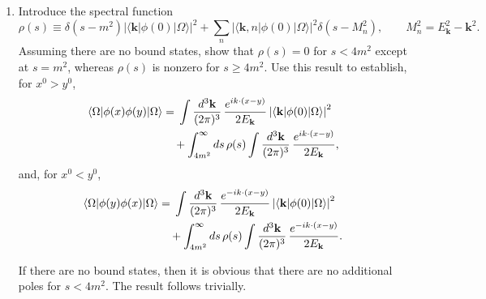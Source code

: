 \begin{enumerate}[label=\alph*)]
    \item Introduce the spectral function
    \begin{equation}
        \rho(s)
        \equiv
        \delta(s-m^2)
        \left|\langle\mathbf k|\phi(0)|\Omega\rangle\right|^2
        +\sum_n
        \left|\langle\mathbf k,n|\phi(0)|\Omega\rangle\right|^2
        \delta(s-M_n^2),
        \qquad
        M_n^2=E_{\mathbf k}^2-\mathbf k^2.
    \end{equation}
    Assuming there are no bound states, show that $\rho(s)=0$ for $s<4m^2$
    except at $s=m^2$, whereas $\rho(s)$ is nonzero for $s\geq4m^2$. Use
    this result to establish, for $x^0>y^0$,
    \begin{align}
        \langle\Omega|\phi(x)\phi(y)|\Omega\rangle
        &={}
        \int\frac{d^3\mathbf k}{(2\pi)^3}\,
        \frac{e^{ik\cdot(x-y)}}{2E_{\mathbf k}}
        \left|\langle\mathbf k|\phi(0)|\Omega\rangle\right|^2
        \notag\\
        &\quad+
        \int_{4m^2}^{\infty}ds\,\rho(s)
        \int\frac{d^3\mathbf k}{(2\pi)^3}\,
        \frac{e^{ik\cdot(x-y)}}{2E_{\mathbf k}},
    \end{align}
    and, for $x^0<y^0$,
    \begin{align}
        \langle\Omega|\phi(y)\phi(x)|\Omega\rangle
        &={}
        \int\frac{d^3\mathbf k}{(2\pi)^3}\,
        \frac{e^{-ik\cdot(x-y)}}{2E_{\mathbf k}}
        \left|\langle\mathbf k|\phi(0)|\Omega\rangle\right|^2
        \notag\\
        &\quad+
        \int_{4m^2}^{\infty}ds\,\rho(s)
        \int\frac{d^3\mathbf k}{(2\pi)^3}\,
        \frac{e^{-ik\cdot(x-y)}}{2E_{\mathbf k}}.
    \end{align}
    \begin{solution}
        If there are no bound states, then it is obvious that there are no additional poles for $s<4m^2$. The result follows trivially.
    \end{solution}


\end{enumerate}
